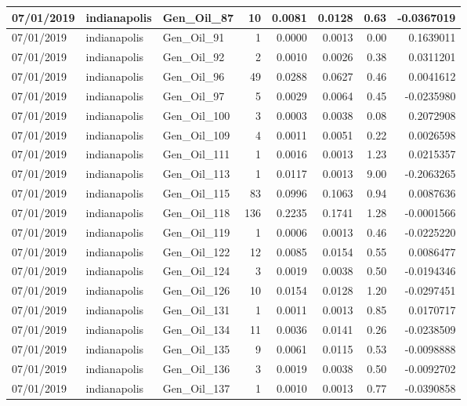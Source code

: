 \documentclass[
  letterpaper,
  DIV=11,
  numbers=noendperiod]{scrartcl}
\begin{document}
\begin{tabular}{l|l|l|r|r|r|r|r}
\hline
07/01/2019 & indianapolis & Gen\_Oil\_87 & 10 & 0.0081 & 0.0128 & 0.63 & -0.0367019\\
\hline
07/01/2019 & indianapolis & Gen\_Oil\_91 & 1 & 0.0000 & 0.0013 & 0.00 & 0.1639011\\
\hline
07/01/2019 & indianapolis & Gen\_Oil\_92 & 2 & 0.0010 & 0.0026 & 0.38 & 0.0311201\\
\hline
07/01/2019 & indianapolis & Gen\_Oil\_96 & 49 & 0.0288 & 0.0627 & 0.46 & 0.0041612\\
\hline
07/01/2019 & indianapolis & Gen\_Oil\_97 & 5 & 0.0029 & 0.0064 & 0.45 & -0.0235980\\
\hline
07/01/2019 & indianapolis & Gen\_Oil\_100 & 3 & 0.0003 & 0.0038 & 0.08 & 0.2072908\\
\hline
07/01/2019 & indianapolis & Gen\_Oil\_109 & 4 & 0.0011 & 0.0051 & 0.22 & 0.0026598\\
\hline
07/01/2019 & indianapolis & Gen\_Oil\_111 & 1 & 0.0016 & 0.0013 & 1.23 & 0.0215357\\
\hline
07/01/2019 & indianapolis & Gen\_Oil\_113 & 1 & 0.0117 & 0.0013 & 9.00 & -0.2063265\\
\hline
07/01/2019 & indianapolis & Gen\_Oil\_115 & 83 & 0.0996 & 0.1063 & 0.94 & 0.0087636\\
\hline
07/01/2019 & indianapolis & Gen\_Oil\_118 & 136 & 0.2235 & 0.1741 & 1.28 & -0.0001566\\
\hline
07/01/2019 & indianapolis & Gen\_Oil\_119 & 1 & 0.0006 & 0.0013 & 0.46 & -0.0225220\\
\hline
07/01/2019 & indianapolis & Gen\_Oil\_122 & 12 & 0.0085 & 0.0154 & 0.55 & 0.0086477\\
\hline
07/01/2019 & indianapolis & Gen\_Oil\_124 & 3 & 0.0019 & 0.0038 & 0.50 & -0.0194346\\
\hline
07/01/2019 & indianapolis & Gen\_Oil\_126 & 10 & 0.0154 & 0.0128 & 1.20 & -0.0297451\\
\hline
07/01/2019 & indianapolis & Gen\_Oil\_131 & 1 & 0.0011 & 0.0013 & 0.85 & 0.0170717\\
\hline
07/01/2019 & indianapolis & Gen\_Oil\_134 & 11 & 0.0036 & 0.0141 & 0.26 & -0.0238509\\
\hline
07/01/2019 & indianapolis & Gen\_Oil\_135 & 9 & 0.0061 & 0.0115 & 0.53 & -0.0098888\\
\hline
07/01/2019 & indianapolis & Gen\_Oil\_136 & 3 & 0.0019 & 0.0038 & 0.50 & -0.0092702\\
\hline
07/01/2019 & indianapolis & Gen\_Oil\_137 & 1 & 0.0010 & 0.0013 & 0.77 & -0.0390858\\

\end{tabular}
\end{document}
